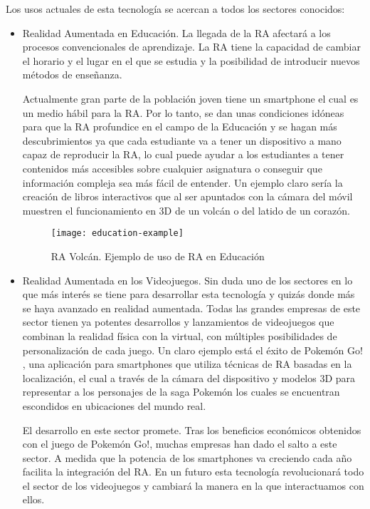 Los usos actuales de esta tecnología se acercan a todos los sectores conocidos:

\begin{itemize}
    \item Realidad Aumentada en Educación. La llegada de la RA afectará a los procesos convencionales de aprendizaje. La RA tiene la capacidad de cambiar el horario y el lugar en el que se estudia y la posibilidad de introducir nuevos métodos de enseñanza. 
    
    Actualmente gran parte de la población joven tiene un smartphone el cual es un medio hábil para la RA. Por lo tanto, se dan unas condiciones idóneas para que la RA profundice en el campo de la Educación y se hagan más descubrimientos ya que cada estudiante va a tener un dispositivo a mano capaz de reproducir la RA, lo cual puede ayudar a los estudiantes a tener contenidos más accesibles sobre cualquier asignatura o conseguir que información compleja sea más fácil de entender. Un ejemplo claro sería la creación de libros interactivos que al ser apuntados con la cámara del móvil muestren el funcionamiento en 3D de un volcán o del latido de un corazón.

    \begin{figure}[h]
        \centering
        \texttt{[image: education-example]}
        \caption{RA Volcán. Ejemplo de uso de RA en Educación }
        \label{fig:education-example}
    \end{figure}
    
    \item Realidad Aumentada en los Videojuegos. Sin duda uno de los sectores en lo que más interés se tiene para desarrollar esta tecnología y quizás donde más se haya avanzado en realidad aumentada. Todas las grandes empresas de este sector tienen ya potentes desarrollos y lanzamientos de videojuegos que combinan la realidad física con la virtual, con múltiples posibilidades de personalización de cada juego. Un claro ejemplo está el éxito de Pokemón Go! \cite{URL::Pokemon-Go}, una aplicación para smartphones que utiliza técnicas de RA basadas en la localización, el cual a través de la cámara del dispositivo y modelos 3D para representar a los personajes de la saga Pokemón \cite{URL::Pokemon} los cuales se encuentran escondidos en ubicaciones del mundo real.  
    
    El desarrollo en este sector promete. Tras los beneficios económicos obtenidos con el juego de Pokemón Go!, muchas empresas han dado el salto a este sector. A medida que la potencia de los smartphones va creciendo cada año facilita la integración del RA. En un futuro esta tecnología revolucionará todo el sector de los videojuegos y cambiará la manera en la que interactuamos con ellos.   
    

\end{itemize}
